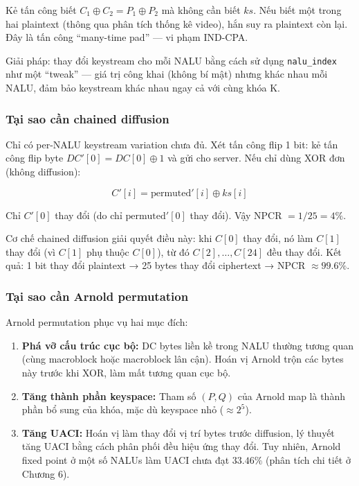 Kẻ tấn công biết $C_1 \oplus C_2 = P_1 \oplus P_2$ mà không cần biết $ks$.
Nếu biết một trong hai plaintext (thông qua phân tích thống kê video), hắn suy ra
plaintext còn lại. Đây là tấn công ``many-time pad'' --- vi phạm IND-CPA.

Giải pháp: thay đổi keystream cho mỗi NALU bằng cách sử dụng \texttt{nalu\_index}
như một ``tweak'' --- giá trị công khai (không bí mật) nhưng khác nhau mỗi NALU,
đảm bảo keystream khác nhau ngay cả với cùng khóa K.

\subsubsection{Tại sao cần chained diffusion}

Chỉ có per-NALU keystream variation chưa đủ. Xét tấn công flip 1 bit:
kẻ tấn công flip byte $DC'[0] = DC[0] \oplus 1$ và gửi cho server.
Nếu chỉ dùng XOR đơn (không diffusion):

\begin{equation}
C'[i] = \text{permuted}'[i] \oplus ks[i]
\end{equation}

Chỉ $C'[0]$ thay đổi (do chỉ $\text{permuted}'[0]$ thay đổi). Vậy NPCR $= 1/25 = 4\%$.

Cơ chế chained diffusion giải quyết điều này: khi $C[0]$ thay đổi, nó làm $C[1]$
thay đổi (vì $C[1]$ phụ thuộc $C[0]$), từ đó $C[2], \ldots, C[24]$ đều thay đổi.
Kết quả: 1 bit thay đổi plaintext → 25 bytes thay đổi ciphertext → NPCR $\approx 99.6\%$.

\subsubsection{Tại sao cần Arnold permutation}

Arnold permutation phục vụ hai mục đích:

\begin{enumerate}
  \item \textbf{Phá vỡ cấu trúc cục bộ:} DC bytes liền kề trong NALU thường
        tương quan (cùng macroblock hoặc macroblock lân cận). Hoán vị Arnold
        trộn các bytes này trước khi XOR, làm mất tương quan cục bộ.

  \item \textbf{Tăng thành phần keyspace:} Tham số $(P, Q)$ của Arnold map
        là thành phần bổ sung của khóa, mặc dù keyspace nhỏ ($\approx 2^5$).

  \item \textbf{Tăng UACI:} Hoán vị làm thay đổi vị trí bytes trước diffusion,
        lý thuyết tăng UACI bằng cách phân phối đều hiệu ứng thay đổi.
        Tuy nhiên, Arnold fixed point ở một số NALUs làm UACI chưa đạt $33.46\%$
        (phân tích chi tiết ở Chương 6).
\end{enumerate}

